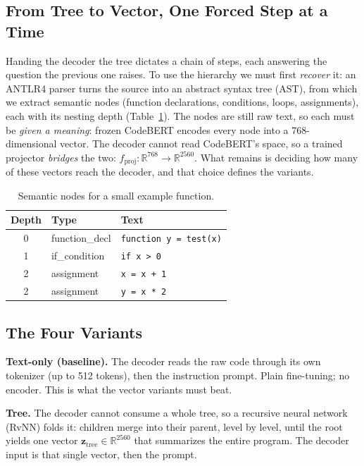 \documentclass[conference]{IEEEtran}
\begin{document}
\subsection{From Tree to Vector, One Forced Step at a Time}
Handing the decoder the tree dictates a chain of steps, each answering the question the previous one raises. To use the hierarchy we must first \emph{recover} it: an ANTLR4 parser turns the source into an abstract syntax tree (AST), from which we extract semantic nodes (function declarations, conditions, loops, assignments), each with its nesting depth (Table~\ref{tab:nodes}). The nodes are still raw text, so each must be \emph{given a meaning}: frozen CodeBERT encodes every node into a 768-dimensional vector. The decoder cannot read CodeBERT's space, so a trained projector \emph{bridges} the two: $f_{\text{proj}}: \mathbb{R}^{768} \rightarrow \mathbb{R}^{2560}$. What remains is deciding how many of these vectors reach the decoder, and that choice defines the variants.

\begin{table}[t]
  \centering
  \caption{Semantic nodes for a small example function.}
  \label{tab:nodes}
  \begin{tabular}{c l l}
    \toprule
    Depth & Type & Text \\
    \midrule
    0 & function\_decl & \texttt{function y = test(x)} \\
    1 & if\_condition  & \texttt{if x > 0} \\
    2 & assignment     & \texttt{x = x + 1} \\
    2 & assignment     & \texttt{y = x * 2} \\
    \bottomrule
  \end{tabular}
\end{table}

\subsection{The Four Variants}
\textbf{Text-only (baseline).} The decoder reads the raw code through its own tokenizer (up to 512 tokens), then the instruction prompt. Plain fine-tuning; no encoder. This is what the vector variants must beat.

\textbf{Tree.} The decoder cannot consume a whole tree, so a recursive neural network (RvNN) folds it: children merge into their parent, level by level, until the root yields one vector $\mathbf{z}_{\text{tree}} \in \mathbb{R}^{2560}$ that summarizes the entire program. The decoder input is that single vector, then the prompt.
\end{document}
